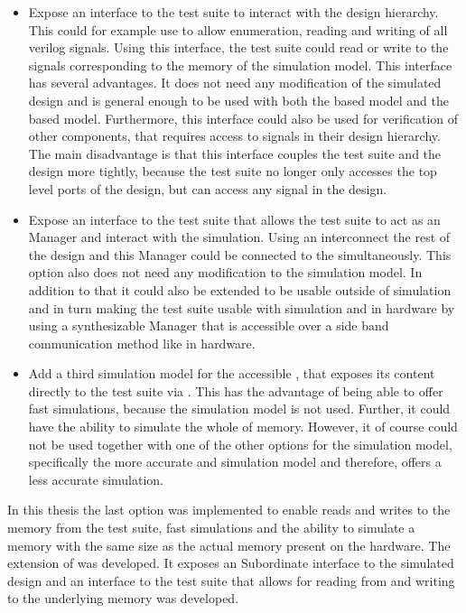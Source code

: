 \begin{itemize}
  \item Expose an interface to the test suite to interact with the design hierarchy. This could for example use \VPI{} to allow enumeration, reading and writing of all verilog signals. Using this interface, the test suite could read or write to the signals corresponding to the memory of the \DRAM{} simulation model. This interface has several advantages. It does not need any modification of the simulated design and is general enough to be used with both the \AXIBRAMController{} based model and the \MIG{} based model. Furthermore, this interface could also be used for verification of other components, that requires access to signals in their design hierarchy. The main disadvantage is that this interface couples the test suite and the \FPGA{} design more tightly, because the test suite no longer only accesses the top level ports of the design, but can access any signal in the \FPGA{} design.
  \item Expose an interface to the test suite that allows the test suite to act as an \AXI{} Manager and interact with the simulation. Using an \AXI{} interconnect the rest of the \FPGA{} design and this \AXI{} Manager could be connected to the \AXI{} \DRAM{} simultaneously. This option also does not need any modification to the \AXI{} \DRAM{} simulation model. In addition to that it could also be extended to be usable outside of simulation and in turn making the test suite usable with simulation and in hardware by using a synthesizable \AXI{} Manager that is accessible over a side band communication method like \JTAG{} in hardware.
  \item Add a third simulation model for the \AXI{} accessible \DRAM{}, that exposes its content directly to the test suite via \flange{}. This has the advantage of being able to offer fast simulations, because the \DDR{} simulation model is not used. Further, it could have the ability to simulate the whole \DDRSIZE{} of memory. However, it of course could not be used together with one of the other options for the \AXI{} \DRAM{} simulation model, specifically the more accurate \MIG{} and \DDR{} simulation model and therefore, offers a less accurate simulation.
\end{itemize}
In this thesis the last option was implemented to enable reads and writes to the memory from the test suite, fast simulations and the ability to simulate a memory with the same size as the actual memory present on the hardware. The \flangedram{} extension of \flange{} was developed. It exposes an \AXI{} Subordinate interface to the simulated \FPGA{} design and an interface to the test suite that allows for reading from and writing to the underlying memory was developed.
